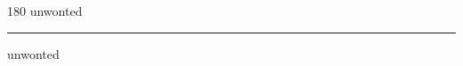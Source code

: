 
\begin{frame}
\begin{center}
\begin{turn}{180}
{\fontsize{2.5cm}{1em}\selectfont unwonted}
\end{turn}
\vspace{1em}\par  
\hrule
\vspace{1em}\par  
{\fontsize{2.5cm}{1em}\selectfont unwonted}
\end{center}
\end{frame}

